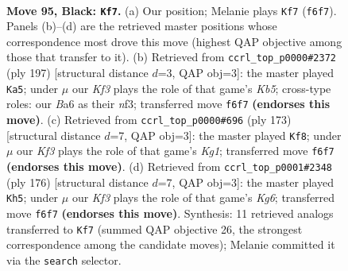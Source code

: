 \documentclass[11pt]{article}
\begin{document}
\clearpage

\begin{figure}[p]\centering
\begin{subfigure}{0.46\textwidth}\centering
\resizebox{\linewidth}{!}{%
\newchessgame
\chessboard[
  setfen={8/8/b4k2/5p1K/5P2/8/8/8 b - - 5 95},
  showmover=false,
  pgfstyle=straightmove, color=movearrow, markmove={f6-f7}
]}
\caption{}
\end{subfigure}\hfill
\begin{subfigure}{0.46\textwidth}\centering
\resizebox{\linewidth}{!}{%
\newchessgame
\chessboard[
  setfen={7b/8/8/8/1k6/p2K1N2/P7/8 b - - 55 99},
  showmover=false,
  pgfstyle=straightmove, color=movearrow, markmove={b4-a5}
]}
\caption{}
\end{subfigure}
\\[4pt]
\begin{subfigure}{0.46\textwidth}\centering
\resizebox{\linewidth}{!}{%
\newchessgame
\chessboard[
  setfen={6k1/5p2/3K1P2/8/3n4/3B4/8/8 b - - 11 87},
  showmover=false,
  pgfstyle=straightmove, color=movearrow, markmove={g8-f8}
]}
\caption{}
\end{subfigure}\hfill
\begin{subfigure}{0.46\textwidth}\centering
\resizebox{\linewidth}{!}{%
\newchessgame
\chessboard[
  setfen={4k3/8/5PKp/b7/6P1/8/8/8 w - - 5 89},
  showmover=false,
  pgfstyle=straightmove, color=movearrow, markmove={g6-h5}
]}
\caption{}
\end{subfigure}
\caption{\textbf{Move 95, Black: \texttt{Kf7}.} (a) Our position; Melanie plays \texttt{Kf7} (\texttt{f6f7}). Panels (b)--(d) are the retrieved master positions whose correspondence most drove this move (highest QAP objective among those that transfer to it). (b) Retrieved from \texttt{ccrl\_top\_p0000\#2372} (ply 197) [structural distance $d$=3, QAP obj=3]: the master played \texttt{Ka5}; under $\mu$ our \emph{Kf3} plays the role of that game's \emph{Kb5}; cross-type roles: our \emph{B}a6 as their \emph{n}f3; transferred move \texttt{f6f7} \textbf{(endorses this move)}. (c) Retrieved from \texttt{ccrl\_top\_p0000\#696} (ply 173) [structural distance $d$=7, QAP obj=3]: the master played \texttt{Kf8}; under $\mu$ our \emph{Kf3} plays the role of that game's \emph{Kg1}; transferred move \texttt{f6f7} \textbf{(endorses this move)}. (d) Retrieved from \texttt{ccrl\_top\_p0001\#2348} (ply 176) [structural distance $d$=7, QAP obj=3]: the master played \texttt{Kh5}; under $\mu$ our \emph{Kf3} plays the role of that game's \emph{Kg6}; transferred move \texttt{f6f7} \textbf{(endorses this move)}. Synthesis: 11 retrieved analogs transferred to \texttt{Kf7} (summed QAP objective 26, the strongest correspondence among the candidate moves); Melanie committed it via the \texttt{search} selector.}
\label{fig:thought-m189}
\end{figure}
\end{document}
